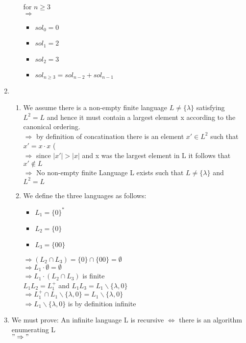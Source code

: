 \documentclass[8pt]{extreport}
\begin{document}
\begin{enumerate}
\begin{enumerate}[label = \alph*)]
\begin{enumerate}
\end{enumerate}
for $n\geq 3$\\
$\Rightarrow$
\begin{itemize}
\item $sol_{0}  = 0$
\item $sol_{1} = 2$
\item $sol_{2} = 3$
\item $sol_{n \geq  3} = sol_{n-2} + sol_{n-1}$
\end{itemize}
\end{enumerate}
\item 
\begin{enumerate}[label = \alph*)]
\item
We assume there is a non-empty finite language $L \neq \{\lambda\}$ satisfying $L^2 = L$ and hence it must contain a largest element x according to the canonical ordering.\\
$\Rightarrow$ by definition of concatination there is an element $x' \in L^2$ such that $ x' = x\cdot x$ (\\
$\Rightarrow$ since $|x'| > |x|$ and x was the largest element in L it follows that $x' \notin L$\\
$\Rightarrow$ No non-empty finite Language L exists such that $L \neq \{\lambda\}$ and $L^2 = L$
\item We define the three languages as follows:
\begin{itemize}
\item $L_1 = \{0\}^*$
\item $L_2 = \{0\}$
\item $L_3 = \{00\}$
\end{itemize}
$\Rightarrow  (L_2 \cap L_3) = \{0\} \cap \{00\} = \emptyset$\\
$\Rightarrow L_1 \cdot \emptyset = \emptyset$\\
$\Rightarrow L_1 \cdot (L_2 \cap L_3)$ is finite\\
\newline
$L_1L_2 = L_1^+$ and $L_1L_3 = L_1\backslash\{\lambda,0\}$\\
$\Rightarrow L_1^+ \cap L_1\backslash\{\lambda,0\} = L_1\backslash\{\lambda,0\}$ \\
$\Rightarrow L_1\backslash\{\lambda,0\}$ is by definition infinite
\end{enumerate}
\item We must prove: An infinite language L is recursive $\iff$ there is an algorithm enumerating L\\
$"\Rightarrow"$\\

\end{enumerate}
\end{document}
